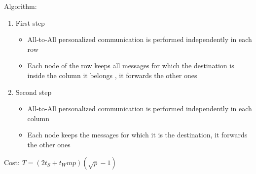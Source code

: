 \documentclass[11pt,a4paper]{report}
\begin{document}
Algorithm:

\begin{enumerate}
    \item First step
    \begin{itemize}
        \item All-to-All personalized communication is performed independently 
        in each row
        \item Each node of the row keeps all messages for which the destination 
        is inside the column it belongs , it forwards the other ones
    \end{itemize}

    \item Second step
    \begin{itemize}
        \item All-to-All personalized communication is performed independently 
        in each column
        
        \item Each node keeps the messages for which it is the destination, it 
        forwards the other ones
    \end{itemize}
\end{enumerate}

Cost: $ T=(2t_{S} +t_{W}mp)(\sqrt{p} - 1) $

\end{document}
